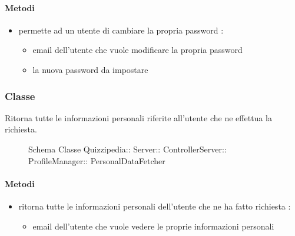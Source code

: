 \paragraph{Metodi}
\begin{itemize}
\item {}
\newline
permette ad un utente di cambiare la propria password
\newline
{} :
\begin{itemize}
\item {}
\newline
email dell'utente che vuole modificare la propria password
\item {}
\newline
la nuova password da impostare
\end{itemize}
\end{itemize}
\subsubsection{Classe }
Ritorna tutte le informazioni personali riferite all'utente che ne effettua la richiesta.
\begin{figure}[H]
\centering
\noindent{}
\caption[Schema Classe PersonalDataFetcher]{Schema Classe Quizzipedia:: Server:: ControllerServer:: ProfileManager:: PersonalDataFetcher}
\end{figure}
\paragraph{Metodi}
\begin{itemize}
\item {}
\newline
ritorna tutte le informazioni personali dell'utente che ne ha fatto richiesta
\newline
{} :
\begin{itemize}
\item {}
\newline
email dell'utente che vuole vedere le proprie informazioni personali
\end{itemize}
\end{itemize}
